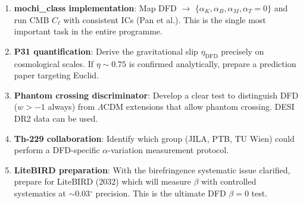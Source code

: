 \documentclass[11pt,a4paper]{article}
\begin{document}
\begin{enumerate}
\item \textbf{mochi\_class implementation}: Map DFD $\to$ $\{\alpha_K, \alpha_B, \alpha_M, \alpha_T=0\}$ and run CMB $C_\ell$ with consistent ICs (Pan et al.). This is the single most important task in the entire programme.
\item \textbf{P31 quantification}: Derive the gravitational slip $\eta_\mathrm{DFD}$ precisely on cosmological scales. If $\eta \sim 0.75$ is confirmed analytically, prepare a prediction paper targeting Euclid.
\item \textbf{Phantom crossing discriminator}: Develop a clear test to distinguish DFD ($w > -1$ always) from $\Lambda$CDM extensions that allow phantom crossing. DESI DR2 data can be used.
\item \textbf{Th-229 collaboration}: Identify which group (JILA, PTB, TU Wien) could perform a DFD-specific $\alpha$-variation measurement protocol.
\item \textbf{LiteBIRD preparation}: With the birefringence systematic issue clarified, prepare for LiteBIRD (2032) which will measure $\beta$ with controlled systematics at $\sim$0.03$^\circ$ precision. This is the ultimate DFD $\beta = 0$ test.
\end{enumerate}
\end{document}
